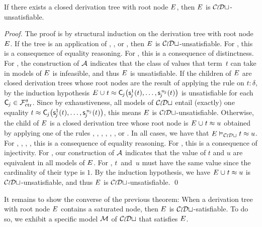 \begin{theorem}%
\label{thm:rs}%
\afterDot
If there exists a closed derivation tree with root node\/ $E$, then\/ $E$ is $\mathcal{CoDt}$-unsatisfiable.
\end{theorem}
\begin{proof}
The proof is by structural induction on the derivation tree with root node $E$.
If the tree is an application of , , or ,
then $E$ is $\mathcal{CoDt}$-unsatisfiable.
For , this is a consequence of equality reasoning.
For , this is a consequence of distinctness.
For , the construction of $\mathcal{A}$ indicates that the class of values that term~$t$ can take in models of $E$ is infeasible,
and thus $E$ is unsatisfiable.
If the children of $E$ are closed derivation trees
whose root nodes are the result of applying the rule  on $t : \delta$,
by the induction hypothesis $E \mathrel\cup t \approx \smash{\textsf{C}_{\kern-0.083333em j}\bigl( \textsf{s}^1_{\kern-0.083333em j}( t ), \ldots, \textsf{s}^{\,\smash{n_{\kern-0.083333em j}}}_{\kern-0.083333em j}( t ) \bigr)}$ is unsatisfiable
for each $\textsf{C}_{\kern-0.083333em j} \in \smash{\mathcal{F}_{\mathrm{ctr}}^\delta}$.
Since by exhaustiveness, all models of $\mathcal{CoDt}$ entail (exactly) one equality $t \approx \textsf{C}_{\kern-0.083333em j}\bigl( \textsf{s}^1_{\kern-0.083333em j}( t ), \ldots, \textsf{s}^{\,\smash{n_{\kern-0.083333em j}}}_{\kern-0.083333em j}( t ) \bigr)$,
this means $E$ is $\mathcal{CoDt}$-unsatisfiable.
Otherwise, the child of $E$ is a closed derivation tree
whose root node is $E \mathrel\cup t \approx u$ obtained by applying one of the rules , , , , , , or .
In all cases, we have that $E \vDash_{\mathcal{CoDt}} t \approx u$.
For , , , , this is a consequence of equality reasoning.
For , this is a consequence of injectivity.
For , our construction of $\mathcal{A}$ indicates that the value of $t$ and $u$ are equivalent in all models of $E$.
For , $t$~and~$u$ must have the same value since the cardinality of their type is $1$.
By the induction hypothesis, we have $E \mathrel\cup t \approx u$ is $\mathcal{CoDt}$-unsatisfiable,
and thus $E$ is $\mathcal{CoDt}$-unsatisfiable.
\qed
\end{proof}

It remains to show the converse of the previous theorem: When a derivation tree
with root node $E$ contains a saturated node, then $E$ is
$\mathcal{CoDt}$-satisfiable.
To do so, we exhibit a specific model $\mathcal{M}$ of $\mathcal{CoDt}$ that satisfies $E$.

